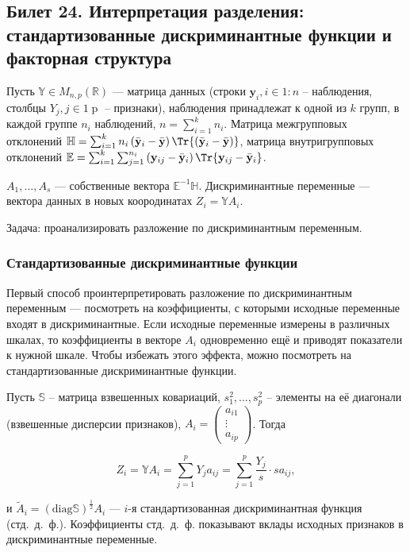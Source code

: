 \subsection{Билет 24. Интерпретация разделения: стандартизованные дискриминантные функции и факторная структура}

	Пусть $\mathbb Y \in M_{n, p}\left(\mathbb R\right)$ --- матрица данных (строки $\mathbf y_i, i \in 1\mathbin : n$ -- наблюдения, столбцы $Y_j, j\in 1\mathbin p$ -- признаки), 
	наблюдения принадлежат к одной из $k$ групп, 
	в каждой группе $n_i$ наблюдений, $n = \sum_{i=1}^k n_i$. %
	Матрица межгрупповых отклонений $\mathbb H = \sum_{i=1}^k n_i\left(\bar{\mathbf y}_i - \bar{\mathbf y}\right)\Tr{\left(\bar{\mathbf y}_i - \bar{\mathbf y}\right)}$, 
	матрица внутригрупповых отклонений $\mathbb E = \sum_{i=1}^k\sum_{j=1}^{n_i} \left(\mathbf y_{ij} - \bar{\mathbf y}_i\right)\Tr{\mathbf y_{ij} - \bar{\mathbf y}_i}$.

	$A_1, \ldots, A_s$ --- собственные вектора $\mathbb E^{-1}\mathbb H$. Дискриминантные переменные --- вектора данных в новых коородинатах $Z_i = \mathbb Y A_i$.

	Задача: проанализировать разложение по дискриминантным переменным.

	\subsubsection{Стандартизованные дискриминантные функции}
		Первый способ проинтерпретировать разложение по дискриминантным переменным --- посмотреть на коэффициенты, с которыми исходные переменные входят в дискриминантные. Если исходные переменные измерены в различных шкалах, то коэффициенты в векторе $A_i$ одновременно ещё и приводят показатели к нужной шкале. Чтобы избежать этого эффекта, можно посмотреть на стандартизованные дискриминантные функции.

		Пусть $\mathbb S$ -- матрица взвешенных ковариаций, $s_1^2, \ldots, s_p^2$ -- элементы на её диагонали (взвешенные дисперсии признаков), $A_i = \begin{pmatrix} a_{i1}\\ \vdots\\a_{ip}\end{pmatrix}$. Тогда

		$$Z_i = \mathbb Y A_i = \sum_{j=1}^p Y_j a_{ij} = \sum_{j=1}^p \frac{Y_j}{s}\cdot s a_{ij},$$

		и $\tilde A_i = \left(\mathrm{diag}\mathbb S\right)^{\frac{1}{2}}A_i$ --- $i$-я стандартизованная дискриминантная функция (стд.~д.~ф.). Коэффициенты стд.~д.~ф. показывают вклады исходных признаков в дискриминантные переменные.


